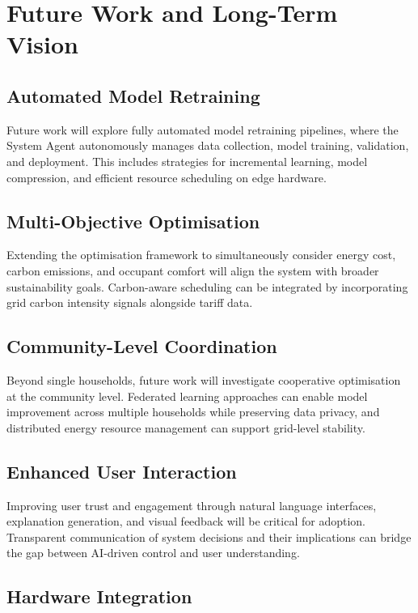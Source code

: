 \documentclass[11pt,a4paper]{article}
\begin{document}
\section{Future Work and Long-Term Vision}

\subsection{Automated Model Retraining}

Future work will explore fully automated model retraining pipelines, where the System Agent autonomously manages data collection, model training, validation, and deployment. This includes strategies for incremental learning, model compression, and efficient resource scheduling on edge hardware.

\subsection{Multi-Objective Optimisation}

Extending the optimisation framework to simultaneously consider energy cost, carbon emissions, and occupant comfort will align the system with broader sustainability goals. Carbon-aware scheduling can be integrated by incorporating grid carbon intensity signals alongside tariff data.

\subsection{Community-Level Coordination}

Beyond single households, future work will investigate cooperative optimisation at the community level. Federated learning approaches can enable model improvement across multiple households while preserving data privacy, and distributed energy resource management can support grid-level stability.

\subsection{Enhanced User Interaction}

Improving user trust and engagement through natural language interfaces, explanation generation, and visual feedback will be critical for adoption. Transparent communication of system decisions and their implications can bridge the gap between AI-driven control and user understanding.

\subsection{Hardware Integration}
\end{document}

